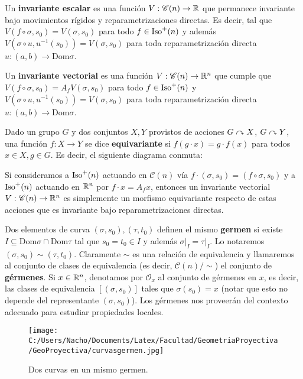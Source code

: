 \begin{defn}
Un \textbf{invariante escalar} es una función $V:\mathscr{C}(n)\to\mathbb{R}$ que permanece invariante bajo movimientos rígidos y reparametrizaciones directas. Es decir, tal que $V(f\circ\sigma,s_0) = V(\sigma,s_0)$ para todo $f\in\operatorname{Iso}^+(n)$ y además $V(\sigma\circ u,u^{-1}(s_0)) = V(\sigma,s_0)$ para toda reparametrización directa $u:(a,b)\to \mathrm{Dom}\sigma$.
\end{defn}

\begin{defn}
Un \textbf{invariante vectorial} es una función $V:\mathscr{C}(n)\to\mathbb{R}^n$ que cumple que $V(f\circ\sigma,s_0)=A_f V(\sigma,s_0)$ para todo $f\in\operatorname{Iso}^+(n)$ y $V(\sigma\circ u,u^{-1}(s_0)) = V(\sigma,s_0)$ para toda reparametrización directa $u:(a,b)\to\mathrm{Dom}\sigma$.
\end{defn}

\begin{comm}
Dado un grupo $G$ y dos conjuntos $X,Y$ provistos de acciones $G\curvearrowright X$, $G\curvearrowright Y$, una función $f:X\to Y$ se dice \textbf{equivariante} si $f(g\cdot x)=g\cdot f(x)$ para todos $x\in X,g\in G$. Es decir, el siguiente diagrama conmuta:

\begin{center}
\end{center}

Si consideramos a $\operatorname{Iso}^+(n)$ actuando en $\mathscr{C}(n)$ vía $f\cdot (\sigma,s_0) = (f\circ\sigma,s_0)$ y a $\operatorname{Iso}^+(n)$ actuando en $\mathbb{R}^n$ por $f\cdot x = A_f x$, entonces un invariante vectorial $V:\mathscr{C}(n)\to\mathbb{R}^n$ es simplemente un morfismo equivariante respecto de estas acciones que es invariante bajo reparametrizaciones directas.
\end{comm}

\begin{defn}
Dos elementos de curva $(\sigma,s_0),(\tau,t_0)$ definen el mismo \textbf{germen} si existe $I\subseteq \mathrm{Dom}\sigma\cap\mathrm{Dom}\tau$ tal que $s_0=t_0\in I$ y además $\left.\sigma\right|_{I} = \left.\tau\right|_{I}$. Lo notaremos $(\sigma,s_0)\sim (\tau,t_0)$. Claramente $\sim$ es una relación de equivalencia y llamaremos al conjunto de clases de equivalencia (es decir, $\mathscr{C}(n)/\sim$) el conjunto de \textbf{gérmenes}. Si $x\in\mathbb{R}^n$, denotamos por $\mathcal{O}_x$ al conjunto de gérmenes en $x$, es decir, las clases de equivalencia $[(\sigma,s_0)]$ tales que $\sigma(s_0)=x$ (notar que esto no depende del representante $(\sigma,s_0)$). Los gérmenes nos proveerán del contexto adecuado para estudiar propiedades locales. 
\begin{figure}[h]
	\centering
		\texttt{[image: C:/Users/Nacho/Documents/Latex/Facultad/GeometriaProyectiva/GeoProyectiva/curvasgermen.jpg]}
	\caption{Dos curvas en un mismo germen.}
	\label{fig:curvasgermen}
\end{figure}
\end{defn}

